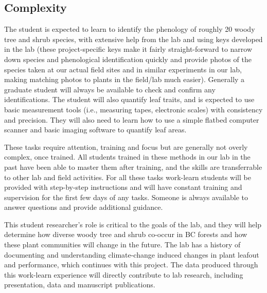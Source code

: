 \documentclass[11pt, oneside]{article}   	%
\begin{document}

\subsection {Complexity}

The student is expected to learn to identify the phenology of roughly 20 woody tree and shrub species, with extensive help from the lab and using keys developed in the lab (these project-specific keys make it fairly straight-forward to narrow down species and phenological identification quickly and provide photos of the species taken at our actual field sites and in similar experiments in our lab, making matching photos to plants in the field/lab much easier). Generally a graduate student will always be available to check and confirm any identifications. The student will also quantify leaf traits, and is expected to use basic measurement tools (i.e., measuring tapes, electronic scales) with consistency and precision. They will also need to learn how to use a simple flatbed computer scanner and basic imaging software to quantify leaf areas. 

These tasks require attention, training and focus but are generally not overly complex, once trained. All students trained in these methods in our lab in the past have been able to master them after training, and the skills are transferrable to other lab and field activities. For all these tasks work-learn students will be provided with step-by-step instructions and will have constant training and supervision for the first few days of any tasks. Someone is always available to answer questions and provide additional guidance. 

This student researcher's role is critical to the goals of the lab, and they will help determine how diverse woody tree and shrub co-occur in BC forests and how these plant communities will change in the future. The lab has a history of documenting and understanding climate-change induced changes in plant leafout and performance, which continues with this project. The data produced through this work-learn experience will directly contribute to lab research, including presentation, data and manuscript publications. 
\end{document}
